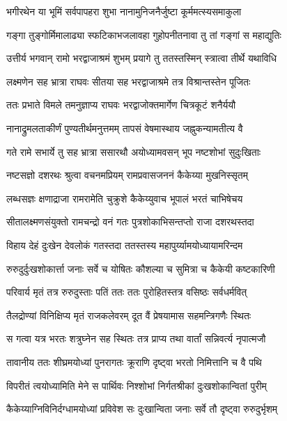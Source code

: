 \twolineshloka
{भगीरथेन या भूमिं सर्वपापहरा शुभा}
{नानामुनिजनैर्जुष्टा कूर्ममत्स्यसमाकुला} %

\twolineshloka
{गङ्गा तुङ्गोर्मिमालाढ्या स्फटिकाभजलावहा}
{गुहोपनीतनावा तु तां गङ्गां स महाद्युतिः} %

\twolineshloka
{उत्तीर्य भगवान् रामो भरद्वाजाश्रमं शुभम्}
{प्रयागे तु ततस्तस्मिन् स्त्रात्वा तीर्थे यथाविधि} %

\twolineshloka
{लक्ष्मणेन सह भ्रात्रा राघवः सीतया सह}
{भरद्वाजाश्रमे तत्र विश्रान्तस्तेन पूजितः} %

\twolineshloka
{ततः प्रभाते विमले तमनुज्ञाप्य राघवः}
{भरद्वाजोक्तमार्गेण चित्रकूटं शनैर्ययौ} %

\twolineshloka
{नानाद्रुमलताकीर्णं पुण्यतीर्थमनुत्तमम्}
{तापसं वेषमास्थाय जह्नुकन्यामतीत्य वै} %

\twolineshloka
{गते रामे सभार्ये तु सह भ्रात्रा ससारथौ}
{अयोध्यामवसन् भूप नष्टशोभां सुदुःखिताः} %

\twolineshloka
{नष्टसज्ञो दशरथः श्रुत्वा वचनमप्रियम्}
{रामप्रवासजननं कैकेय्या मुखनिस्सृतम्} %

\twolineshloka
{लब्धसज्ञः क्षणाद्राजा रामरामेति चुक्रुशे}
{कैकेय्युवाच भूपालं भरतं चाभिषेचय} %

\twolineshloka
{सीतालक्ष्मणसंयुक्तो रामचन्द्रो वनं गतः}
{पुत्रशोकाभिसन्तप्तो राजा दशरथस्तदा} %

\twolineshloka
{विहाय देहं दुःखेन देवलोकं गतस्तदा}
{ततस्तस्य महापुर्य्यामयोध्यायामरिन्दम} %

\twolineshloka
{रुरुदुर्दुःखशोकार्त्ता जनाः सर्वे च योषितः}
{कौशल्या च सुमित्रा च कैकेयी कष्टकारिणी} %

\twolineshloka
{परिवार्य मृतं तत्र रुरुदुस्ताः पतिं ततः}
{ततः पुरोहितस्तत्र वसिष्ठः सर्वधर्मवित्} %

\twolineshloka
{तैलद्रोण्यां विनिक्षिप्य मृतं राजकलेवरम्}
{दूत वैं प्रेषयामास सहमन्त्रिगणैः स्थितः} %

\twolineshloka
{स गत्वा यत्र भरतः शत्रुघ्नेन सह स्थितः}
{तत्र प्राप्य तथा वार्तां सन्निवर्त्य नृपात्मजौ} %

\twolineshloka
{तावानीय ततः शीघ्रमयोध्यां पुनरागतः}
{क्रूराणि दृष्ट्वा भरतो निमित्तानि च वै पथि} %

\twolineshloka
{विपरीतं त्वयोध्यामिति मेने स पार्थिवः}
{निश्शोभां निर्गतश्रीकां दुःखशोकान्वितां पुरीम्} %

\twolineshloka
{कैकेय्याग्निविनिर्दग्धामयोध्यां प्रविवेश सः}
{दुःखान्विता जनाः सर्वे तौ दृष्ट्वा रुरुदुर्भृशम्} %

